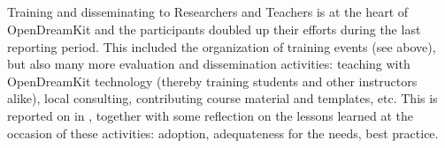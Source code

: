\subparagraph{}


Training and disseminating to Researchers and Teachers is at the heart
of OpenDreamKit and the participants doubled up their efforts during
the last reporting period. This included the organization of training
events (see  above), but also many
more evaluation and dissemination activities: teaching with
OpenDreamKit technology (thereby training students and other
instructors alike), local consulting, contributing course material and
templates, etc. This is reported on in
, together with some reflection on the
lessons learned at the occasion of these activities: adoption,
adequateness for the needs, best practice.

